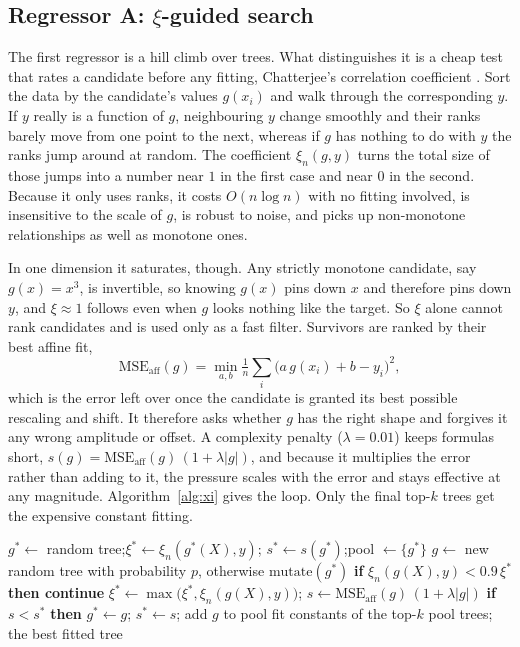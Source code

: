 \documentclass{article}
\begin{document}
\subsection{Regressor A: $\xi$-guided search}

The first regressor is a hill climb over trees. What distinguishes it is
a cheap test that rates a candidate before any fitting, Chatterjee's
correlation coefficient \citep{chatterjee2020newcoefficientcorrelation}. Sort the data by the
candidate's values $g(x_i)$ and walk through the corresponding $y$. If
$y$ really is a function of $g$, neighbouring $y$ change smoothly and
their ranks barely move from one point to the next, whereas if $g$ has
nothing to do with $y$ the ranks jump around at random. The coefficient
$\xi_n(g, y)$ turns the total size of those jumps into a number near $1$
in the first case and near $0$ in the second. Because it only uses
ranks, it costs $O(n \log n)$ with no fitting involved, is insensitive
to the scale of $g$, is robust to noise, and picks up non-monotone
relationships as well as monotone ones.

In one dimension it saturates, though. Any strictly monotone candidate,
say $g(x) = x^3$, is invertible, so knowing $g(x)$ pins down $x$ and
therefore pins down $y$, and $\xi \approx 1$ follows even when $g$ looks
nothing like the target. So $\xi$ alone cannot rank candidates and is
used only as a fast filter. Survivors are ranked by their best affine
fit,
\[
  \mathrm{MSE}_{\mathrm{aff}}(g)
  = \min_{a,b} \tfrac1n \sum_i \bigl(a\,g(x_i)+b-y_i\bigr)^2,
\]
which is the error left over once the candidate is granted its best
possible rescaling and shift. It therefore asks whether $g$ has the
right shape and forgives it any wrong amplitude or offset. A complexity
penalty ($\lambda = 0.01$) keeps formulas short,
$s(g) = \mathrm{MSE}_{\mathrm{aff}}(g)\,(1 + \lambda |g|)$, and because
it multiplies the error rather than adding to it, the pressure scales
with the error and stays effective at any magnitude.
Algorithm~\ref{alg:xi} gives the loop. Only the final top-$k$ trees get
the expensive constant fitting.

\begin{algorithm}[H]
\caption{$\xi$-guided search (defaults: $T{=}20000$, $p{=}0.15$, $k{=}5$)}
\label{alg:xi}
\begin{algorithmic}[1]
\State $g^\ast \gets$ random tree;\quad $\xi^\ast \gets \xi_n(g^\ast(X), y)$;
       \quad $s^\ast \gets s(g^\ast)$;\quad pool $\gets \{g^\ast\}$
    \State $g \gets$ new random tree with probability $p$,
           otherwise $\mathrm{mutate}(g^\ast)$
    \State \textbf{if} $\xi_n(g(X), y) < 0.9\,\xi^\ast$ \textbf{then
           continue} 
    \State $\xi^\ast \gets \max\bigl(\xi^\ast, \xi_n(g(X), y)\bigr)$;\quad
           $s \gets \mathrm{MSE}_{\mathrm{aff}}(g)\,(1 + \lambda |g|)$
    \State \textbf{if} $s < s^\ast$ \textbf{then}
           $g^\ast \gets g$;\; $s^\ast \gets s$;\; add $g$ to pool
\EndFor
\State fit constants of the top-$k$ pool trees; \Return the best fitted tree
\end{algorithmic}
\end{algorithm}
\end{document}
